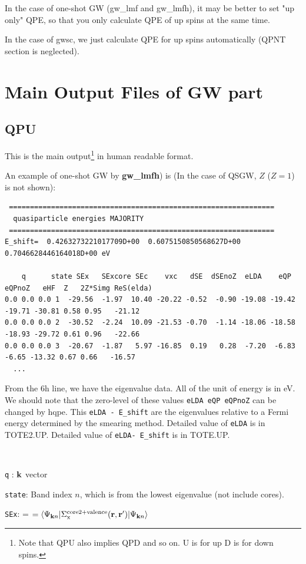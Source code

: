 \documentclass[a4paper,10pt,epsf,fleqn]{article}
\newcommand{\fx}[1]{\subsection{\sf #1\index{\sf #1}}}
\newcommand{\exe}[1]{{\bf #1}}
\begin{document}
{In the case of one-shot GW (gw\_lmf and gw\_lmfh),
it may be better to set "up only" QPE,
so that you only calculate QPE of up spins at the same time.

In the case of gwsc, we just calculate QPE for up spins
automatically (QPNT section is neglected).



\newpage
\section{Main Output Files of GW part}
\label{mainoutputgw}
\fx{QPU}
This is the main output\footnote{Note that QPU also implies QPD and so
on. U is for up D is for down spins.} in 
human readable format. 

An example of one-shot GW by \exe{gw\_lmfh}) is 
(In the case of QSGW, $Z$ ($Z=1$) is not shown):
{\baselineskip=2.6mm \small
\begin{verbatim} 
 ===============================================================
  quasiparticle energies MAJORITY
 ===============================================================
E_shift=  0.4263273221017709D+00  0.6075150850568627D+00  0.7046628446164018D+00 eV

    q      state SEx   SExcore SEc    vxc   dSE  dSEnoZ  eLDA    eQP  eQPnoZ   eHF  Z   2Z*Simg ReS(elda)
0.0 0.0 0.0 1  -29.56  -1.97  10.40 -20.22 -0.52  -0.90 -19.08 -19.42 -19.71 -30.81 0.58 0.95   -21.12
0.0 0.0 0.0 2  -30.52  -2.24  10.09 -21.53 -0.70  -1.14 -18.06 -18.58 -18.93 -29.72 0.61 0.96   -22.66
0.0 0.0 0.0 3  -20.67  -1.87   5.97 -16.85  0.19   0.28  -7.20  -6.83  -6.65 -13.32 0.67 0.66   -16.57
  ...
\end{verbatim}}
From the 6h line, we have the eigenvalue data. All of the unit of energy is in eV.
We should note that the zero-level of these values {\tt eLDA  eQP eQPnoZ} can be changed  by hqpe.
This {\tt eLDA - E\_shift} are the eigenvalues relative to a Fermi energy determined by the smearing method.
Detailed value of {\tt eLDA} is in {\sf TOTE2.UP}.
Detailed value of {\tt eLDA- E\_shift} is in {\sf TOTE.UP}.

\ 

{\tt q}  : ${\bf k}$ vector

{\tt state}: Band index $n$, which is from the lowest eigenvalue (not include cores).

{\tt SEx}: = $= \langle\Psi_{{\bf k}n}|\Sigma_{\rm x}^{\rm core2+valence}({\bf r},{\bf r}^{\prime})|\Psi_{{\bf k}n}\rangle$

}
\end{document}
